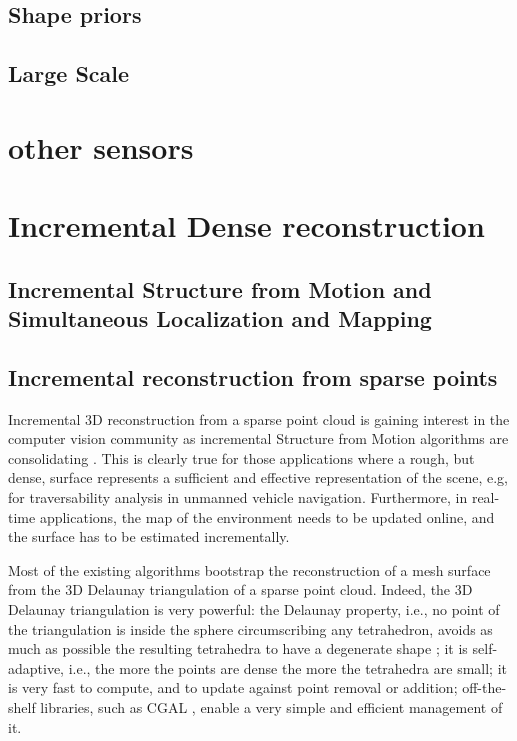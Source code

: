 \subsection{Shape priors}
\subsection{Large Scale}
\section{other sensors}


\section{Incremental Dense reconstruction}
\subsection{Incremental Structure from Motion and Simultaneous Localization and Mapping}

\subsection{Incremental reconstruction from sparse points}
Incremental 3D reconstruction from a sparse point cloud is gaining interest in the computer vision community as incremental Structure from Motion algorithms are consolidating  \cite{wu13}. 
This is clearly true for those applications where a rough, but dense, surface represents a sufficient and effective representation of the scene, e.g, for traversability analysis in unmanned vehicle navigation. 
Furthermore, in real-time applications, the map of the environment needs to be updated online, and the surface has to be estimated incrementally. 

Most of the existing algorithms \cite{Lovi_et_al_11,Pan_et_al09,litvinov_lhuillier_13,litvinov_Lhiuller14} bootstrap the reconstruction of a mesh surface from the 3D Delaunay triangulation of a sparse point cloud. Indeed, the 3D Delaunay triangulation  is very powerful:
the Delaunay property, i.e., no point of the triangulation is inside the sphere circumscribing any tetrahedron, avoids as much as possible the resulting tetrahedra to have a degenerate shape \cite{Maur_02}; it is self-adaptive, i.e., the more the points are dense the more the tetrahedra are small; it is very fast to compute, and to  update against point removal or addition; off-the-shelf libraries, such as CGAL \cite{cgal}, enable a very simple and efficient management of it. 

